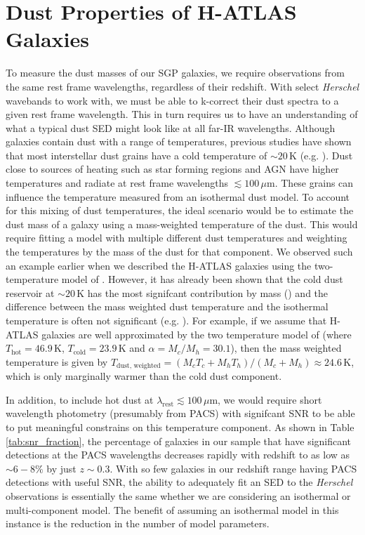\section{Dust Properties of H-ATLAS Galaxies}

To measure the dust masses of our SGP galaxies, we require observations from the same rest frame wavelengths, regardless of their redshift. With select \textit{Herschel} wavebands to work with, we must be able to k-correct their dust spectra to a given rest frame wavelength. This in turn requires us to have an understanding of what a typical dust SED might look like at all far-IR wavelengths. Although galaxies contain dust with a range of temperatures, previous studies have shown that most interstellar dust grains have a cold temperature of $\sim 20\,$K (e.g. \citealt{Dunne_2001, Vlahakis_2005, Draine_2007a, Boselli_2010, Smith_2012b, Smith_2013}). Dust close to sources of heating such as star forming regions and AGN have higher temperatures and radiate at rest frame wavelengths $\lesssim 100\,\mu$m. These grains can influence the temperature measured from an isothermal dust model. To account for this mixing of dust temperatures, the ideal scenario would be to estimate the dust mass of a galaxy using a mass-weighted temperature of the dust. This would require fitting a model with multiple different dust temperatures and weighting the temperatures by the mass of the dust for that component. We observed such an example earlier when we described the H-ATLAS galaxies using the two-temperature model of \citealt{Pearson_2013}. However, it has already been shown that the cold dust reservoir at $\sim 20\,$K has the most signifcant contribution by mass (\citealt{Pearson_2013}) and the difference between the mass weighted dust temperature and the isothermal temperature is often not significant (e.g. \citealt{Clark_2015}). For example, if we assume that H-ATLAS galaxies are well approximated by the two temperature model of \citealt{Pearson_2013} (where $T_{\textrm{hot}} = 46.9\,$K, $T_{\textrm{cold}} = 23.9\,$K and $\alpha = M_c/M_h = 30.1$), then the mass weighted temperature is given by $T_{\textrm{dust, weighted}} = (M_cT_c + M_hT_h)/(M_c + M_h) \approx 24.6\,$K, which is only marginally warmer than the cold dust component.

In addition, to include hot dust at $\lambda_{\textrm{rest}} \lesssim 100\,\mu$m, we would require short wavelength photometry (presumably from PACS) with signifcant SNR to be able to put meaningful constrains on this temperature component. As shown in Table \ref{tab:snr_fraction}, the percentage of galaxies in our sample that have significant detections at the PACS wavelengths decreases rapidly with redshift to as low as $\sim 6 - 8\%$ by just $z \sim 0.3$. With so few galaxies in our redshift range having PACS detections with useful SNR, the ability to adequately fit an SED to the \textit{Herschel} observations is essentially the same whether we are considering an isothermal or multi-component model. The benefit of assuming an isothermal model in this instance is the reduction in the number of model parameters.

